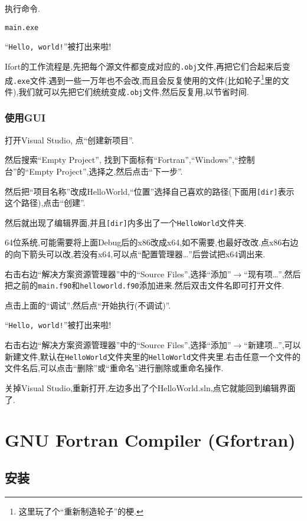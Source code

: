 执行命令.
\begin{verbatim}
main.exe
\end{verbatim}
``\verb|Hello, world!|''被打出来啦!

Ifort的工作流程是,先把每个源文件都变成对应的\verb|.obj|文件,再把它们合起来后变成\verb|.exe|文件.遇到一些一万年也不会改,而且会反复使用的文件(比如轮子\footnote{
    这里玩了个``重新制造轮子''的梗.
}里的文件),我们就可以先把它们统统变成\verb|.obj|文件,然后反复用,以节省时间.

\subsubsection{使用GUI}

打开Visual Studio, 点``创建新项目''.

然后搜索``Empty Project'', 找到下面标有``Fortran'',``Windows'',``控制台''的``Empty Project'',选择之,然后点击``下一步''.

然后把``项目名称''改成HelloWorld,``位置''选择自己喜欢的路径(下面用\verb|[dir]|表示这个路径),点击``创建''.

然后就出现了编辑界面,并且\verb|[dir]|内多出了一个\verb|HelloWorld|文件夹.

64位系统,可能需要将上面Debug后的x86改成x64,如不需要,也最好改改.点x86右边的向下箭头可以改,若没有x64,可以点``配置管理器\dots''后尝试把x64调出来.

右击右边``解决方案资源管理器''中的``Source Files'',选择``添加''$\rightarrow$``现有项\dots'',然后把之前的\verb|main.f90|和\verb|helloworld.f90|添加进来.然后双击文件名即可打开文件.

点击上面的``调试'',然后点``开始执行(不调试)''.

``\verb|Hello, world!|''被打出来啦!

右击右边``解决方案资源管理器''中的``Source Files'',选择``添加''$\rightarrow$``新建项\dots'',可以新建文件,默认在\verb|HelloWorld|文件夹里的\verb|HelloWorld|文件夹里.右击任意一个文件的文件名后,可以点击``删除''或``重命名''进行删除或重命名操作.

关掉Visual Studio,重新打开,左边多出了个HelloWorld.sln,点它就能回到编辑界面了.

\section[GNU Fortran Compiler]{GNU Fortran Compiler (Gfortran)}

\subsection{安装}

